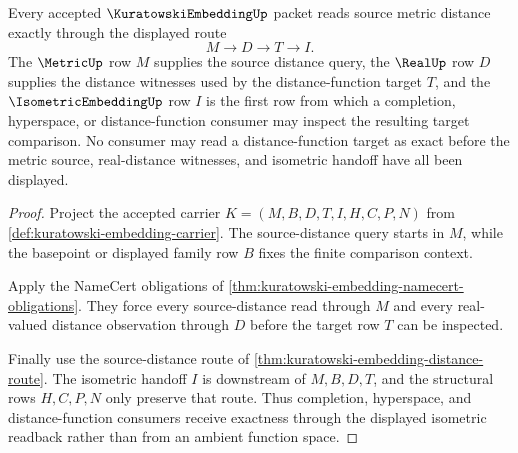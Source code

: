 \begin{theorem}
\label{thm:kuratowski-embedding-distance-readback}
Every accepted $\KuratowskiEmbeddingUp$ packet reads source metric distance exactly through the displayed route
$$
M \to D \to T \to I.
$$
The $\MetricUp$ row $M$ supplies the source distance query, the $\RealUp$ row $D$ supplies the distance witnesses used by the distance-function target $T$, and the $\IsometricEmbeddingUp$ row $I$ is the first row from which a completion, hyperspace, or distance-function consumer may inspect the resulting target comparison. No consumer may read a distance-function target as exact before the metric source, real-distance witnesses, and isometric handoff have all been displayed.
\end{theorem}
\begin{proof}
Project the accepted carrier $K=(M,B,D,T,I,H,C,P,N)$ from \autoref{def:kuratowski-embedding-carrier}. The source-distance query starts in $M$, while the basepoint or displayed family row $B$ fixes the finite comparison context.

Apply the NameCert obligations of \autoref{thm:kuratowski-embedding-namecert-obligations}. They force every source-distance read through $M$ and every real-valued distance observation through $D$ before the target row $T$ can be inspected.

Finally use the source-distance route of \autoref{thm:kuratowski-embedding-distance-route}. The isometric handoff $I$ is downstream of $M,B,D,T$, and the structural rows $H,C,P,N$ only preserve that route. Thus completion, hyperspace, and distance-function consumers receive exactness through the displayed isometric readback rather than from an ambient function space.
\end{proof}


\begin{closurestatus}{\KuratowskiEmbeddingUp}
  \theoryclosure{\seedClosure}
  \formalstatus{\unformalizedV}
\end{closurestatus}
